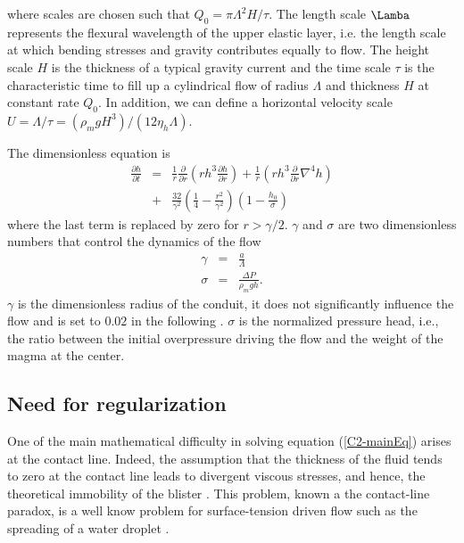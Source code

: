 where scales  are chosen  such that $Q_0  = \pi\Lambda^2  H/\tau$. The
length scale $\Lamba$ represents the  flexural wavelength of the upper
elastic layer,  i.e. the  length scale at  which bending  stresses and
gravity  contributes equally  to flow.   The height  scale $H$  is the
thickness of  a typical gravity current  and the time scale  $\tau$ is
the  characteristic time  to  fill  up a  cylindrical  flow of  radius
$\Lambda$ and thickness  $H$ at constant rate $Q_0$.   In addition, we
can       define        a       horizontal        velocity       scale
$U=\Lambda/\tau=\left(\rho_m           g           H^3\right)/\left(12
  \eta_h\Lambda\right)$.

The dimensionless equation is
\begin{eqnarray}
  \frac{\partial h}{\partial t}& =&\frac{1}{ r}
                                    \frac{\partial}{\partial r}  \left( rh^3  \frac{\partial h}{\partial
                                    r}\right)+\frac{1}{ r} \left( rh^3
                                    \frac{\partial}{\partial
                                    r}\nabla^4h\right)\nonumber\\
                               &+&
                                   \frac{32}{\gamma^{2}}\left(\frac{1}{4}-\frac{r^{2}}{\gamma^{2}}\right)\left(1-\frac{h_0}{\sigma}\right)
                                   \label{C2-mainEq}
\end{eqnarray}
where the last term is replaced by zero for $r>\gamma/2$. $\gamma$ and
$\sigma$ are  two dimensionless numbers  that control the  dynamics of
the flow
\begin{eqnarray}
  \gamma &=& \frac{a}{\Lambda}\\
  \sigma &=& \frac{\Delta P}{\rho_m g h}.
\end{eqnarray}
$\gamma$  is the  dimensionless radius  of  the conduit,  it does  not
significantly influence the flow and is set to $0.02$ in the following
\citep{Michaut:2009jx,Michaut:2011kg}.   $\sigma$  is  the  normalized
pressure  head,  i.e.,  the  ratio between  the  initial  overpressure
driving the flow and the weight of the magma at the center.
	 
\subsection{Need for regularization}
\label{C2-sec:need-regularization}

One  of   the  main   mathematical  difficulty  in   solving  equation
(\ref{C2-mainEq}) arises at the  contact line.  Indeed, the assumption
that the  thickness of  the fluid  tends to zero  at the  contact line
leads  to  divergent  viscous  stresses, and  hence,  the  theoretical
immobility                of                the                blister
\citep{Flitton:1999iv,Lister:2013ia,Anonymous:QWXp_4JV}. This problem,
known  a  the  contact-line  paradox,  is  a  well  know  problem  for
surface-tension driven flow  such as the spreading of  a water droplet
\citep{Bertozzi:1998wz,Snoeijer:2013cm}.

